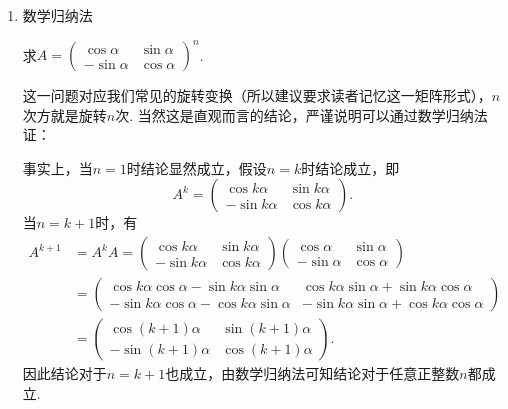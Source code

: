 \begin{enumerate}
    \item 数学归纳法
          \begin{example}{}{}
              求$A=\begin{pmatrix}\cos\alpha & \sin\alpha \\ -\sin\alpha & \cos\alpha\end{pmatrix}^n$.
          \end{example}
          这一问题对应我们常见的旋转变换（所以建议要求读者记忆这一矩阵形式），$n$次方就是旋转$n$次. 当然这是直观而言的结论，严谨说明可以通过数学归纳法证：

          \begin{solution}
              事实上，当$n=1$时结论显然成立，假设$n=k$时结论成立，即
              \[A^k=\begin{pmatrix}\cos k\alpha & \sin k\alpha \\ -\sin k\alpha & \cos k\alpha\end{pmatrix}.\]
              当$n=k+1$时，有
              \begin{align*}
                  A^{k+1} & =A^kA=\begin{pmatrix}\cos k\alpha & \sin k\alpha \\ -\sin k\alpha & \cos k\alpha\end{pmatrix}\begin{pmatrix}\cos\alpha & \sin\alpha \\ -\sin\alpha & \cos\alpha\end{pmatrix}                                                  \\
                          & =\begin{pmatrix}\cos k\alpha\cos\alpha-\sin k\alpha\sin\alpha & \cos k\alpha\sin\alpha+\sin k\alpha\cos\alpha \\ -\sin k\alpha\cos\alpha-\cos k\alpha\sin\alpha & -\sin k\alpha\sin\alpha+\cos k\alpha\cos\alpha\end{pmatrix} \\
                          & =\begin{pmatrix}\cos(k+1)\alpha & \sin(k+1)\alpha \\ -\sin(k+1)\alpha & \cos(k+1)\alpha\end{pmatrix}.
              \end{align*}
              因此结论对于$n=k+1$也成立，由数学归纳法可知结论对于任意正整数$n$都成立.
          \end{solution}


\end{enumerate}
